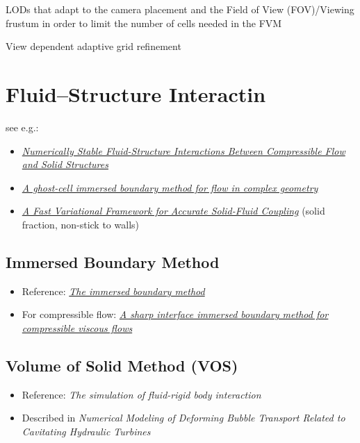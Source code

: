 LODs that adapt to the camera placement and the Field of View (FOV)/Viewing frustum in order to limit the number of cells needed in the FVM

View dependent adaptive grid refinement

\section{Fluid--Structure Interactin}

see e.g.:

\begin{itemize}
    \item \textit{\href{http://physbam.stanford.edu/~fedkiw/papers/stanford2010-04.pdf}{Numerically Stable Fluid-Structure Interactions Between Compressible Flow and Solid Structures}}
    \item \textit{\href{http://efdl.as.ntu.edu.tw/research/papers/JCP03GCIBM.pdf}{A ghost-cell immersed boundary method for flow in complex geometry}}
    \item \textit{\href{http://www.cs.columbia.edu/~batty/papers/Batty07.pdf}{A Fast Variational Framework for Accurate Solid-Fluid Coupling}} (solid fraction, non-stick to walls)
\end{itemize}

\subsection{Immersed Boundary Method}

\begin{itemize}
    \item Reference: \textit{\href{http://www4.ncsu.edu/~zhilin/TEACHING/MA798Z/Peskin1.pdf}{The immersed boundary method}}
    \item For compressible flow: \textit{\href{http://www.cecs.wright.edu/~haibo.dong/wp-content/themes/publications/IBM_JCP_2007.pdf}{A sharp interface immersed boundary method for compressible viscous flows}}
\end{itemize}

\subsection{Volume of Solid Method (VOS)}

\begin{itemize}
    \item Reference: \textit{The simulation of fluid-rigid body interaction}
    \item Described in \textit{Numerical Modeling of Deforming Bubble Transport Related to Cavitating Hydraulic Turbines}
\end{itemize}

